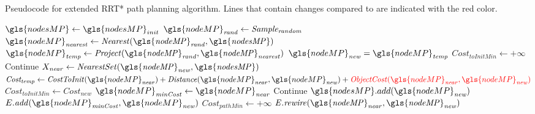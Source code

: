 \newpage
\begin{algorithm}[H]
  \caption{Pseudocode for extended \ac{RRT*} path planning algorithm. Lines that contain changes compared to  are indicated with the red color.}%
  \label{pseudocode:modified_proposed_rrt_star}
  \begin{algorithmic}[1]
    \State $\gls{nodesMP} \leftarrow \gls{nodesMP}_{init}$
        \State $\gls{nodeMP}_\mathit{rand} \leftarrow \mathit{Sample_{random}}$ 
      \State $\gls{nodeMP}_\mathit{nearest} \leftarrow \mathit{Nearest(\gls{nodeMP}_{rand}, \gls{nodesMP})}$
      \State $\gls{nodeMP}_\mathit{temp} \leftarrow \mathit{Project(\gls{nodeMP}_{rand}, \gls{nodeMP}_{nearest})}$
      \State $\gls{nodeMP}_\mathit{new} = \gls{nodeMP}_\mathit{temp}$
      \State $\mathit{Cost_{toInitMin}} \leftarrow +\infty$ 
      \Else
      \State Continue
      \EndIf
      \State $X_\mathit{near} \leftarrow \mathit{NearestSet(\gls{nodeMP}_{new}, \gls{nodesMP})}$ 
    \State $\mathit{Cost_{temp}} \leftarrow \mathit{CostToInit}(\gls{nodeMP}_\mathit{near}) + \mathit{Distance}(\gls{nodeMP}_\mathit{near}, \gls{nodeMP}_\mathit{new}) + \textcolor{red}{\mathit{ObjectCost}(\gls{nodeMP}_\mathit{near}, \gls{nodeMP}_\mathit{new})}$
      \State $\mathit{Cost_{toInitMin}} \leftarrow \mathit{Cost_{new}}$
      \State $\gls{nodeMP}_\mathit{minCost} \leftarrow \gls{nodeMP}_\mathit{near}$
      \EndIf
      \EndFor
          \State Continue
      \Else
      \State $\gls{nodesMP}.add(\gls{nodeMP}_\mathit{new})$
      \State $E.\mathit{add}(\gls{nodeMP}_\mathit{minCost}, \gls{nodeMP}_\mathit{new})$
      \EndIf
      \State $\mathit{Cost_{pathMin}} \leftarrow +\infty$ 
      \State $\mathit{E.rewire(\gls{nodeMP}_{near}, \gls{nodeMP}_{new})}$
      \EndIf
      \Else {}


\end{algorithmic}
\end{algorithm}

